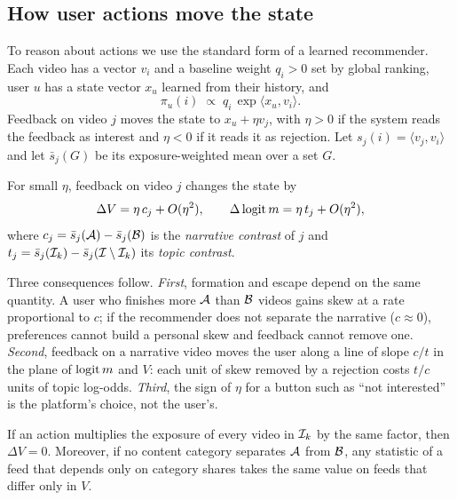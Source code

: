 \subsection{How user actions move the state}
\label{sec:actions}

To reason about actions we use the standard form of a learned recommender. Each video has a vector $v_i$ and a baseline weight $q_i>0$ set by global ranking, user $u$ has a state vector $x_u$ learned from their history, and
\begin{equation}
  \pi_u(i)\;\propto\;q_i\,\exp\langle x_u,v_i\rangle .
  \label{eq:softmax}
\end{equation}
Feedback on video $j$ moves the state to $x_u+\eta v_j$, with $\eta>0$ if the system reads the feedback as interest and $\eta<0$ if it reads it as rejection. Let $s_j(i)=\langle v_j,v_i\rangle$ and let $\bar s_j(G)$ be its exposure-weighted mean over a set $G$.

\begin{proposition}
\label{prop:feedback}
For small $\eta$, feedback on video $j$ changes the state by
\begin{equation}
  \Delta V=\eta\,c_j+O(\eta^2),\qquad \Delta\operatorname{logit} m=\eta\,t_j+O(\eta^2),
\end{equation}
where $c_j=\bar s_j(\mathcal{A})-\bar s_j(\mathcal{B})$ is the \emph{narrative contrast} of $j$ and $t_j=\bar s_j(\mathcal{I}_k)-\bar s_j(\mathcal{I}\setminus\mathcal{I}_k)$ its \emph{topic contrast}.
\end{proposition}

Three consequences follow. \emph{First}, formation and escape depend on the same quantity. A user who finishes more $\mathcal{A}$ than $\mathcal{B}$ videos gains skew at a rate proportional to $c$; if the recommender does not separate the narrative ($c\approx0$), preferences cannot build a personal skew and feedback cannot remove one. \emph{Second}, feedback on a narrative video moves the user along a line of slope $c/t$ in the plane of $\operatorname{logit} m$ and $V$: each unit of skew removed by a rejection costs $t/c$ units of topic log-odds. \emph{Third}, the sign of $\eta$ for a button such as ``not interested'' is the platform's choice, not the user's.

\begin{proposition}
\label{prop:topic}
If an action multiplies the exposure of every video in $\mathcal{I}_k$ by the same factor, then $\Delta V=0$. Moreover, if no content category separates $\mathcal{A}$ from $\mathcal{B}$, any statistic of a feed that depends only on category shares takes the same value on feeds that differ only in $V$.
\end{proposition}

